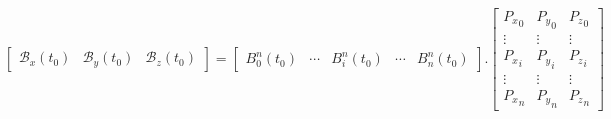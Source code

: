 \documentclass{amsart}
\begin{document}
  \pagestyle{empty}

  \begin{equation*}
    \begin{bmatrix}
      \mathscr{B}_{x}{\left(t_{0}\right)} & \mathscr{B}_{y}{\left(t_{0}\right)} & \mathscr{B}_{z}{\left(t_{0}\right)}
    \end{bmatrix}
    =
    \begin{bmatrix}
      B_{0}^{n}\left(t_{0}\right) & \cdots & B_{i}^{n}\left(t_{0}\right) & \cdots & B_{n}^{n}\left(t_{0}\right)
    \end{bmatrix}
    .
    \begin{bmatrix}
      {P_{x}}_{0} & {P_{y}}_{0} & {P_{z}}_{0} \\
      \vdots & \vdots & \vdots \\
      {P_{x}}_{i} & {P_{y}}_{i} & {P_{z}}_{i} \\
      \vdots & \vdots & \vdots \\
      {P_{x}}_{n} & {P_{y}}_{n} & {P_{z}}_{n}
    \end{bmatrix}
  \end{equation*}
\end{document}
